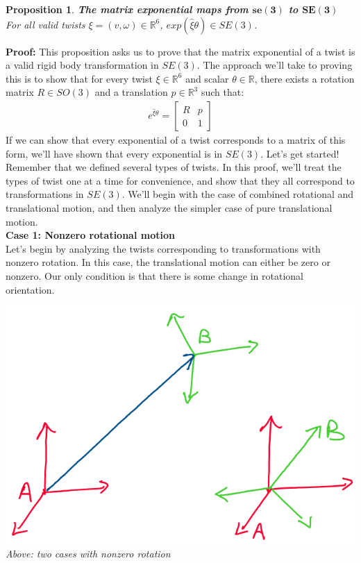 \documentclass[oneside]{book}
\newtheorem{proposition}{Proposition}
\newenvironment{prop} %
  {\colorlet{shadecolor}{blue!9}\begin{shaded}\begin{proposition}}
  {\end{proposition}\end{shaded}}
\begin{document}
\begin{prop}
\textbf{The matrix exponential maps from $\mathbf{se(3)}$ to $\mathbf{SE(3)}$}\\
For all valid twists $\xi = (v, \omega) \in \mathbb{R}^6$, $exp(\hat\xi\theta) \in SE(3)$.
\end{prop}
\noindent
\textbf{Proof:} This proposition asks us to prove that the matrix exponential of a twist is a valid rigid body transformation in $SE(3)$. The approach we'll take to proving this is to show that for every twist $\xi \in \mathbb{R}^6$ and scalar $\theta \in \mathbb{R}$, there exists a rotation matrix $R \in SO(3)$ and a translation $p \in \mathbb{R}^3$ such that:
\begin{align}
    e^{\hat\xi \theta} = 
    \begin{bmatrix}
        R & p\\
        0 & 1
    \end{bmatrix}
\end{align}
If we can show that every exponential of a twist corresponds to a matrix of this form, we'll have shown that every exponential is in $SE(3)$. Let's get started!\\
Remember that we defined several types of twists. In this proof, we'll treat the types of twist one at a time for convenience, and show that they all correspond to transformations in $SE(3)$. We'll begin with the case of combined rotational and translational motion, and then analyze the simpler case of pure translational motion.\\
\textbf{Case 1: Nonzero rotational motion}\\
Let's begin by analyzing the twists corresponding to transformations with nonzero rotation. In this case, the translational motion can either be zero or nonzero. Our only condition is that there is some change in rotational orientation.\\
\begin{center}
    \includegraphics[scale=0.3]{images/nonzero_rotation.png}\\
    \textit{Above: two cases with nonzero rotation}
\end{center}
\end{document}
